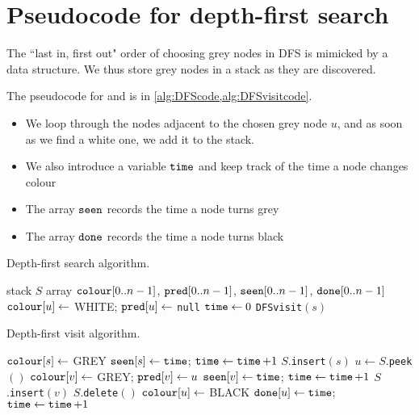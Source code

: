 \section{Pseudocode for depth-first search} \label{ss: DFS}
The ``last in, first out" order of choosing grey nodes in DFS is mimicked by a  data structure. 
We thus store grey nodes in a stack as they are discovered. 

The pseudocode for  and  is in \cref{alg:DFScode,alg:DFSvisitcode}. 
\begin{itemize}
  \item We loop through the nodes adjacent to the chosen grey node $u$, 
  and as soon as we find a white one, we add it to the stack.
  \item We also introduce a variable $\operatorname{\text{\texttt{time}}}$ and keep track of the time a node changes colour
  \item The array $\operatorname{\text{\texttt{seen}}}$ records the time a node turns grey
  \item The array  $\operatorname{\text{\texttt{done}}}$ records the time a node turns black
\end{itemize}

\begin{algorithm}[H]
  \caption{Depth-first search algorithm.}
    \label{alg:DFScode}
\begin{algorithmic}[1]
	\State stack $S$ 
	\State array $\operatorname{\text{\texttt{colour}}}[0..n-1]$, $\operatorname{\text{\texttt{pred}}}[0..n-1]$, $\operatorname{\text{\texttt{seen}}}[0..n-1]$, $\operatorname{\text{\texttt{done}}}[0..n-1]$
		\State $\operatorname{\text{\texttt{colour}}}[u] \gets $ WHITE; $\operatorname{\text{\texttt{pred}}}[u] \gets $ \texttt{null} 
	\EndFor
	\State $\operatorname{\text{\texttt{time}}} \gets 0$ 
		  
			\State \texttt{DFSvisit}$(s)$ 
		\EndIf
	\EndFor
	\State \Return{$\pred, \seen, \done$}
\EndFunction
\end{algorithmic}
\end{algorithm}

\begin{algorithm}[H]
  \caption{Depth-first visit algorithm.}
    \label{alg:DFSvisitcode}
\begin{algorithmic}[1]
	\State $\operatorname{\text{\texttt{colour}}}[s] \gets $ GREY 
	\State $\operatorname{\text{\texttt{seen}}}[s] \gets \operatorname{\text{\texttt{time}}}$; $\operatorname{\text{\texttt{time}}} \gets \operatorname{\text{\texttt{time}}} + 1$
	\State $S$.\texttt{insert}$(s)$ 
		\State $u \gets S$.\texttt{peek}$()$  
			\State $\operatorname{\text{\texttt{colour}}}[v] \gets $ GREY; $\operatorname{\text{\texttt{pred}}}[v] \gets u$  
			\State $\operatorname{\text{\texttt{seen}}}[v] \gets \operatorname{\text{\texttt{time}}}$; $\operatorname{\text{\texttt{time}}} \gets \operatorname{\text{\texttt{time}}} + 1$  
			\State $S$.\texttt{insert}$(v)$  
		\Else
			\State $S$.\texttt{delete}$()$  
			\State $\operatorname{\text{\texttt{colour}}}[u] \gets $ BLACK  
			\State $\operatorname{\text{\texttt{done}}}[u] \gets \operatorname{\text{\texttt{time}}}$; $\operatorname{\text{\texttt{time}}} \gets \operatorname{\text{\texttt{time}}} + 1$  
		\EndIf
	\EndWhile
\EndFunction
\end{algorithmic}
\end{algorithm}

